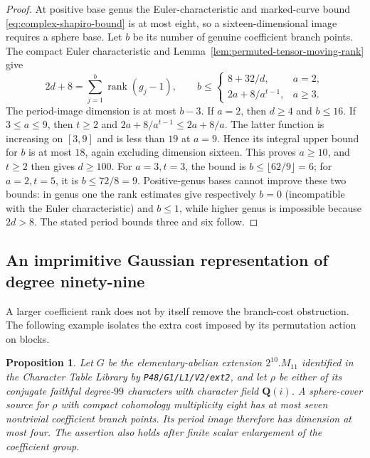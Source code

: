 \documentclass[11pt]{article}
\newtheorem{proposition}[theorem]{Proposition}
\theoremstyle{definition}
\theoremstyle{remark}
\newcommand{\Q}{\mathbf Q}
\begin{document}
\begin{proof}
At positive base genus the Euler-characteristic and
marked-curve bound \eqref{eq:complex-shapiro-bound} is at most
eight, so a sixteen-dimensional image requires a sphere base.
Let $b$ be its number of genuine coefficient branch points.
The compact Euler characteristic and
Lemma~\ref{lem:permuted-tensor-moving-rank} give
\[
 2d+8=\sum_{j=1}^b\operatorname{rank}(g_j-1),\qquad
 b\leq\begin{cases}
 8+32/d,&a=2,\\
 2a+8/a^{t-1},&a\geq3.
 \end{cases}
\]
The period-image dimension is at most $b-3$.
If $a=2$, then $d\geq4$ and $b\leq16$.
If $3\leq a\leq9$, then $t\geq2$ and
$2a+8/a^{t-1}\leq2a+8/a$.
The latter function is increasing on $[3,9]$ and is less than
$19$ at $a=9$.  Hence its integral upper bound for $b$ is at
most $18$, again excluding dimension sixteen.
This proves $a\geq10$, and $t\geq2$ then gives $d\geq100$.
For $a=3,t=3$, the bound is
$b\leq\lfloor62/9\rfloor=6$; for $a=2,t=5$, it is
$b\leq72/8=9$.  Positive-genus bases cannot improve these two
bounds: in genus one the rank estimates give respectively
$b=0$ (incompatible with the Euler characteristic) and
$b\leq1$, while higher genus is impossible because $2d>8$.
The stated period bounds three and six follow.
\end{proof}


\subsection{An imprimitive Gaussian representation of degree ninety-nine}

A larger coefficient rank does not by itself remove the branch-cost
obstruction. The following example isolates the extra cost imposed by
its permutation action on blocks.

\begin{proposition}\label{prop:degree99-cover}
Let $G$ be the elementary-abelian extension $2^{10}.M_{11}$ identified
in the Character Table Library by
\texttt{P48/G1/L1/V2/ext2}, and let $\rho$ be either of its conjugate
faithful degree-$99$ characters with character field $\Q(i)$.
A sphere-cover source for $\rho$ with compact cohomology multiplicity
eight has at most seven nontrivial coefficient branch points. Its
period image therefore has dimension at most four. The assertion
also holds after finite scalar enlargement of the coefficient group.
\end{proposition}
\end{document}
